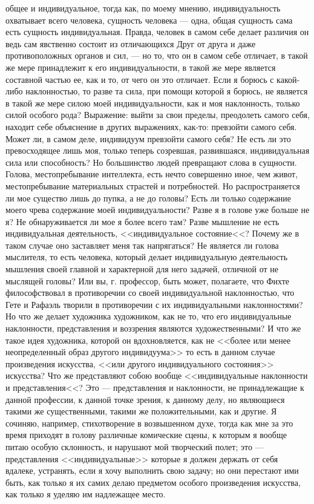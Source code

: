 \documentclass[12pt]{article}
\begin{document}
общее и индивидуальное, тогда как, по моему мнению, индивидуальность охватывает всего человека, сущность человека --- одна, общая сущность сама есть сущность индивидуальная. Правда, человек в самом себе делает различия он ведь сам явственно состоит из отличающихся Друг от друга и даже противоположных органов и сил, --- но то, что он в самом себе отличает, в такой же мере принадлежит к его индивидуальности, в такой же мере является составной частью ее, как и то, от чего он это отличает. Если я борюсь с какой-либо наклонностью, то разве та сила, при помощи которой я борюсь, не является в такой же мере силою моей индивидуальности, как и моя наклонность, только силой особого рода? Выражение: выйти за свои пределы, преодолеть самого себя, находит себе объяснение в других выражениях, как-то: превзойти самого себя. Может ли, в самом деле, индивидуум превзойти самого себя? Не есть ли это превосходящее лишь моя, только теперь созревшая, развившаяся, индивидуальная сила или способность? Но большинство людей превращают слова в сущности. Голова, местопребывание интеллекта, есть нечто совершенно иное, чем живот, местопребывание материальных страстей и потребностей. Но распространяется ли мое существо лишь до пупка, а не до головы? Есть ли только содержание моего чрева содержание моей индивидуальности? Разве я в голове уже больше не я? Не обнаруживается ли мое я более всего там? Разве мышление не есть индивидуальная деятельность, <<индивидуальное состояние<<? Почему же в таком случае оно заставляет меня так напрягаться? Не является ли голова мыслителя, то есть человека, который делает индивидуальную деятельность мышления своей главной и характерной для него задачей, отличной от не мыслящей головы? Или вы, г. профессор, быть может, полагаете, что Фихте философствовал в противоречии со своей индивидуальной наклонностью, что Гете и Рафаэль творили в противоречии с их индивидуальными наклонностями? Но что же делает художника художником, как не то, что его индивидуальные наклонности, представления и воззрения являются художественными? И что же такое идея художника, которой он вдохновляется, как не <<более или менее неопределенный образ другого индивидуума>>  то есть в данном случае произведения искусства, <<или другого индивидуального состояния>> искусства? Что же представляют собою вообще <<индивидуальные наклонности и представления<<? Это --- представления и наклонности, не принадлежащие к данной профессии, к данной точке зрения, к данному делу, но являющиеся такими же существенными, такими же положительными, как и другие. Я сочиняю, например, стихотворение в возвышенном духе, тогда как мне за это время приходят в голову различные комические сцены, к которым я вообще питаю особую склонность, и нарушают мой творческий полет; это --- представления <<индивидуальные>>  которые я должен держать от себя вдалеке, устранять, если я хочу выполнить свою задачу; но они перестают ими быть, как только я их самих делаю предметом особого произведения искусства, как только я уделяю им надлежащее место. 
\end{document}
